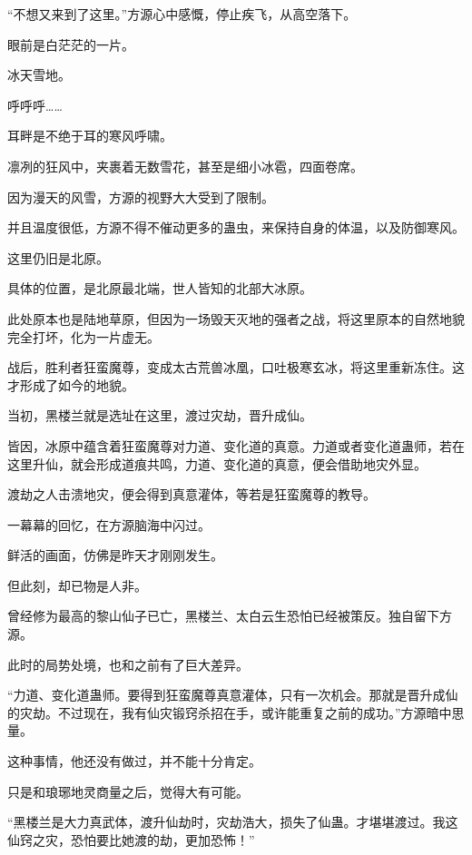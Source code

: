 
\begin{this_body}

“不想又来到了这里。”方源心中感慨，停止疾飞，从高空落下。

眼前是白茫茫的一片。

冰天雪地。

呼呼呼……

耳畔是不绝于耳的寒风呼啸。

凛冽的狂风中，夹裹着无数雪花，甚至是细小冰雹，四面卷席。

因为漫天的风雪，方源的视野大大受到了限制。

并且温度很低，方源不得不催动更多的蛊虫，来保持自身的体温，以及防御寒风。

这里仍旧是北原。

具体的位置，是北原最北端，世人皆知的北部大冰原。

此处原本也是陆地草原，但因为一场毁天灭地的强者之战，将这里原本的自然地貌完全打坏，化为一片虚无。

战后，胜利者狂蛮魔尊，变成太古荒兽冰凰，口吐极寒玄冰，将这里重新冻住。这才形成了如今的地貌。

当初，黑楼兰就是选址在这里，渡过灾劫，晋升成仙。

皆因，冰原中蕴含着狂蛮魔尊对力道、变化道的真意。力道或者变化道蛊师，若在这里升仙，就会形成道痕共鸣，力道、变化道的真意，便会借助地灾外显。

渡劫之人击溃地灾，便会得到真意灌体，等若是狂蛮魔尊的教导。

一幕幕的回忆，在方源脑海中闪过。

鲜活的画面，仿佛是昨天才刚刚发生。

但此刻，却已物是人非。

曾经修为最高的黎山仙子已亡，黑楼兰、太白云生恐怕已经被策反。独自留下方源。

此时的局势处境，也和之前有了巨大差异。

“力道、变化道蛊师。要得到狂蛮魔尊真意灌体，只有一次机会。那就是晋升成仙的灾劫。不过现在，我有仙灾锻窍杀招在手，或许能重复之前的成功。”方源暗中思量。

这种事情，他还没有做过，并不能十分肯定。

只是和琅琊地灵商量之后，觉得大有可能。

“黑楼兰是大力真武体，渡升仙劫时，灾劫浩大，损失了仙蛊。才堪堪渡过。我这仙窍之灾，恐怕要比她渡的劫，更加恐怖！”


\end{this_body}
